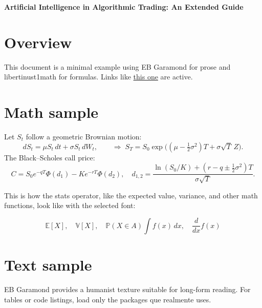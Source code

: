 \documentclass[10pt,a4paper]{article} %
\begin{document}
\thispagestyle{empty}
\vspace*{-5em}
\begin{center}
  \LARGE\textbf{Artificial Intelligence in Algorithmic Trading: An Extended Guide}
\end{center}

\section*{Overview}
This document is a minimal example using EB Garamond for prose and libertinust1math for formulas.
Links like \href{https://example.com}{this one} are active.

\section*{Math sample}
Let $S_t$ follow a geometric Brownian motion:
\[
  dS_t = \mu S_t\,dt + \sigma S_t\,dW_t,\qquad
  \Rightarrow\;
  S_T = S_0 \exp\!\Big((\mu-\tfrac{1}{2}\sigma^2)T+\sigma\sqrt{T}\,Z\Big).
\]
The Black--Scholes call price:
\[
  C = S_0 e^{-qT}\Phi(d_1)-K e^{-rT}\Phi(d_2),
  \quad d_{1,2}=\frac{\ln(S_0/K)+(r-q\pm\tfrac{1}{2}\sigma^2)T}{\sigma\sqrt{T}}.
\]

This is how the stats operator, like the expected value, variance, and other math functions, look like with the selected font:

\[
  \mathbb{E}[X], \quad \mathbb{V}[X], \quad \mathbb{P}(X \in A)
  \int f(x)\,dx, \quad \frac{d}{dx}f(x)
\]

\section*{Text sample}
EB Garamond provides a humanist texture suitable for long-form reading. 
For tables or code listings, load only the packages que realmente uses.
\end{document}
